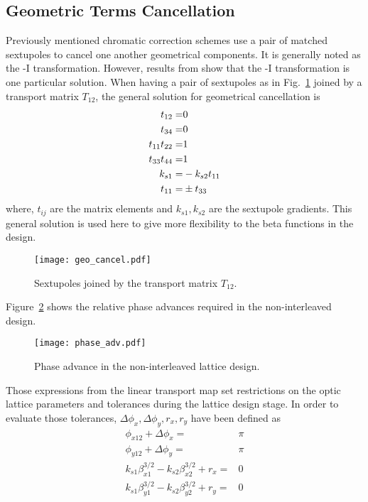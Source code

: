  \subsection{Geometric Terms Cancellation}
Previously mentioned chromatic correction schemes use a pair of matched sextupoles to cancel one another geometrical components. It is generally noted as the -I transformation. However, results from \cite{PhysRevSTAB.8.104002} show that the -I transformation is one particular solution. When having a pair of sextupoles as in Fig.~\ref{f:sext} joined by a transport matrix $T_{12}$, the general solution for geometrical cancellation is
\begin{align}
t_{12}=&0\notag\\
t_{34}=&0\notag\\
t_{11}t_{22}=&1\notag\\
t_{33}t_{44}=&1\\
k_{s1}=&-k_{s2}t_{11}\notag\\
t_{11}=&\pm t_{33}\notag
\end{align}
where, $t_{ij}$ are the matrix elements and $k_{s1}, k_{s2}$ are the sextupole gradients. This general solution is used here to give more flexibility to the beta functions in the design. 
\begin{figure}[h]
   \centering
   \texttt{[image: geo\_cancel.pdf]}
   \caption{Sextupoles joined by the transport matrix $T_{12}$.}
   \label{f:sext}
\end{figure}\par
Figure~\ref{f:phaseadv} shows the relative phase advances required in the non-interleaved design.
\begin{figure}[!htb]
   \centering
   \texttt{[image: phase\_adv.pdf]}
   \caption{Phase advance in the non-interleaved lattice design.}\label{f:phaseadv}
\end{figure}\par
Those expressions from the linear transport map set restrictions on the optic lattice parameters and tolerances during the lattice design stage. In order to evaluate those tolerances, $\Delta\phi_x, \Delta\phi_y, r_x, r_y$ have been defined as
\begin{align}
\phi_{x12}+\Delta\phi_{x} =& \pi\\
\phi_{y12}+\Delta\phi_{y} =& \pi\\
k_{s1}\beta_{x1}^{3/2}-k_{s2}\beta_{x2}^{3/2}+r_x=&0\\
k_{s1}\beta_{y1}^{3/2}-k_{s2}\beta_{y2}^{3/2}+r_y=&0
\end{align}
